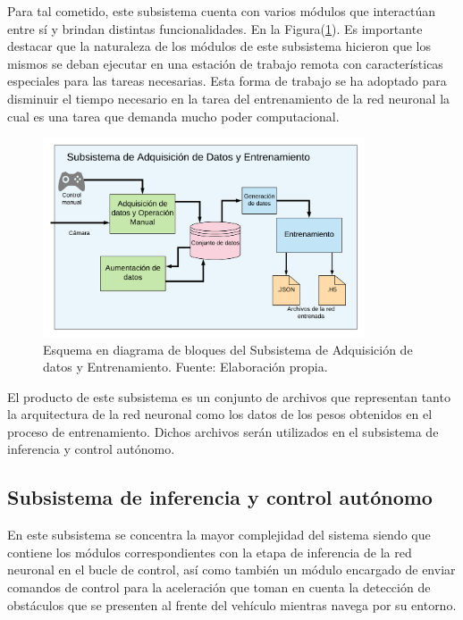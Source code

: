     Para tal cometido, este subsistema cuenta con varios módulos que interactúan entre sí y brindan distintas funcionalidades.
    En la Figura(\ref{fig:daq_esq}). Es importante destacar que la naturaleza de los módulos de este subsistema hicieron que 
    los mismos se deban ejecutar en una estación de trabajo remota con características especiales para las tareas necesarias. 
    Esta forma de trabajo se ha adoptado para disminuir el tiempo necesario en la tarea del entrenamiento de la red neuronal 
    la cual es una tarea que demanda mucho poder computacional.

    \begin{figure}[!h] 
        \centering
        \includegraphics[width=0.85\textwidth]{img/daq_esq}
        \caption[Subsistema de Adquisición de datos y Entrenamiento]{Esquema en diagrama de bloques del Subsistema de Adquisición de datos y Entrenamiento. Fuente: Elaboración propia. }
        \label{fig:daq_esq}
    \end{figure}

    El producto de este subsistema es un conjunto de archivos que representan tanto la arquitectura de la red neuronal como 
    los datos de los pesos obtenidos en el proceso de entrenamiento. Dichos archivos serán utilizados en el subsistema 
    de inferencia y control autónomo.

    \subsection{Subsistema de inferencia y control autónomo}\label{sec:esqinferencia}
    En este subsistema se concentra la mayor complejidad del sistema siendo que contiene los módulos correspondientes 
    con la etapa de inferencia de la red neuronal en el bucle de control, así como también un módulo encargado de enviar 
    comandos de control para la aceleración que toman en cuenta la detección de obstáculos que se presenten al frente 
    del vehículo mientras navega por su entorno. 

